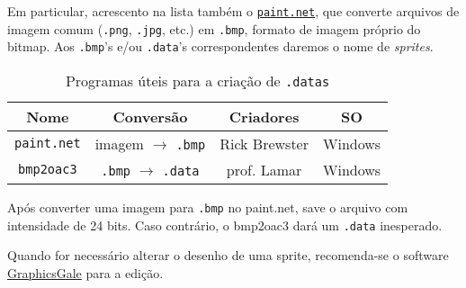 \documentclass[10pt, a4paper, twoside]{article}
\begin{document}
        Em particular, acrescento na lista também o \href{https://www.getpaint.net/index.html}{\tt paint.net}, que converte arquivos de imagem comum ({\tt .png}, {\tt .jpg}, etc.) em {\tt .bmp}, formato de imagem próprio do bitmap.
        Aos {\tt .bmp}'s e/ou {\tt .data}'s correspondentes daremos o nome de \textit{sprites}.
        \begin{table}[H]\centering
            \caption{Programas úteis para a criação de {\tt .datas}}
            \begin{tabular}{cccc}
                \toprule
                Nome & Conversão & Criadores & SO \\
                \midrule\midrule
                {\tt paint.net} & imagem $\to$ {\tt .bmp} & Rick Brewster & Windows \\
                {\tt bmp2oac3} & {\tt .bmp} $\to$ {\tt .data} & prof. Lamar & Windows \\
                \bottomrule
            \end{tabular}
        \end{table}
        \begin{remark}
            Após converter uma imagem para {\tt .bmp} no paint.net, save o arquivo com intensidade de 24 bits. 
            Caso contrário, o bmp2oac3 dará um {\tt .data} inesperado.
        \end{remark}
        Quando for necessário alterar o desenho de uma sprite, recomenda-se o software \href{https://graphicsgale.com/us/}{GraphicsGale} para a edição.
    
\end{document}
